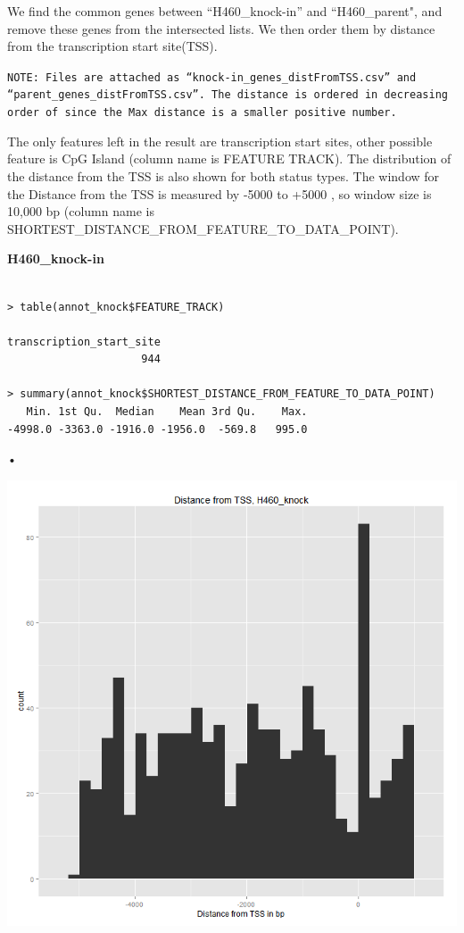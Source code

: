 \documentclass[11pt]{article}
\begin{document}
We find the common genes between “H460\_knock-in” and “H460\_parent", and remove these genes from the intersected lists. We then order them by distance from the transcription start site(TSS).

{\tt NOTE:  Files are attached as “knock-in\_genes\_distFromTSS.csv” and “parent\_genes\_distFromTSS.csv”. The distance is ordered in decreasing order of since the Max distance is a smaller positive number.}

The only features left in the result are transcription start sites, other possible feature is CpG Island (column name  is  FEATURE TRACK). The distribution of the distance from the TSS is also shown for both status types. The window for the Distance from the TSS is measured by  -5000 to +5000 , so window size is 10,000 bp (column name is SHORTEST\_DISTANCE\_FROM\_FEATURE\_TO\_DATA\_POINT).


{\bf H460\_knock-in}

\begin{verbatim}

> table(annot_knock$FEATURE_TRACK)

transcription_start_site 
                     944 

> summary(annot_knock$SHORTEST_DISTANCE_FROM_FEATURE_TO_DATA_POINT)
   Min. 1st Qu.  Median    Mean 3rd Qu.    Max. 
-4998.0 -3363.0 -1916.0 -1956.0  -569.8   995.0 

\end{verbatim}•

\includegraphics[scale=0.5]{distribution_knocking.png}
\end{document}
